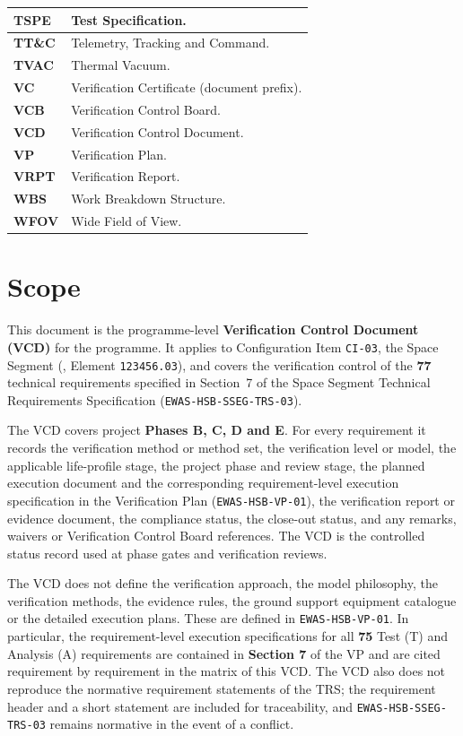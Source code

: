 {\begin{longtable}{|>{\raggedright\arraybackslash}p{3.2cm}|>{\raggedright\arraybackslash}p{12.2cm}|}
\textbf{TSPE} & Test Specification. \\ \hline
\textbf{TT\&C} & Telemetry, Tracking and Command. \\ \hline
\textbf{TVAC} & Thermal Vacuum. \\ \hline
\textbf{VC} & Verification Certificate (document prefix). \\ \hline
\textbf{VCB} & Verification Control Board. \\ \hline
\textbf{VCD} & Verification Control Document. \\ \hline
\textbf{VP} & Verification Plan. \\ \hline
\textbf{VRPT} & Verification Report. \\ \hline
\textbf{WBS} & Work Breakdown Structure. \\ \hline
\textbf{WFOV} & Wide Field of View. \\ \hline
\end{longtable}}

\section{Scope}

This document is the programme-level \textbf{Verification Control Document (VCD)} for the  programme. It applies to Configuration Item \texttt{CI-03}, the  Space Segment (,  Element \texttt{123456.03}), and covers the verification control of the \textbf{77} technical requirements specified in Section~7 of the Space Segment Technical Requirements Specification (\texttt{EWAS-HSB-SSEG-TRS-03}).

The VCD covers project \textbf{Phases B, C, D and E}. For every requirement it records the verification method or method set, the verification level or model, the applicable life-profile stage, the project phase and review stage, the planned execution document and the corresponding requirement-level execution specification in the Verification Plan (\texttt{EWAS-HSB-VP-01}), the verification report or evidence document, the compliance status, the close-out status, and any remarks, waivers or Verification Control Board references. The VCD is the controlled status record used at phase gates and verification reviews.

The VCD does not define the verification approach, the model philosophy, the verification methods, the evidence rules, the ground support equipment catalogue or the detailed execution plans. These are defined in \texttt{EWAS-HSB-VP-01}. In particular, the requirement-level execution specifications for all \textbf{75} Test (T) and Analysis (A) requirements are contained in \textbf{Section 7} of the VP and are cited requirement by requirement in the matrix of this VCD. The VCD also does not reproduce the normative requirement statements of the TRS; the requirement header and a short statement are included for traceability, and \texttt{EWAS-HSB-SSEG-TRS-03} remains normative in the event of a conflict.


